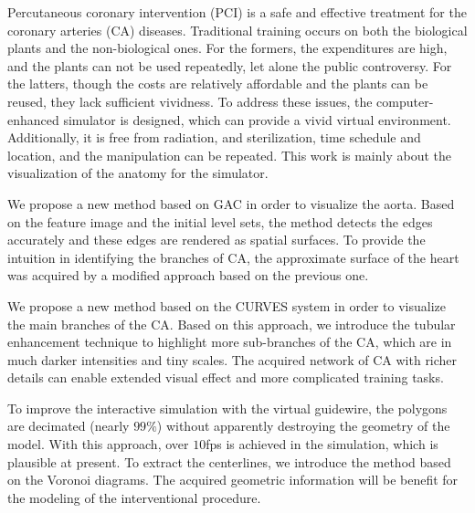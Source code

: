 
\begin{englishabstract}

Percutaneous coronary intervention (PCI) is a safe and effective treatment for the coronary arteries (CA) diseases.
Traditional training occurs on both the biological plants and the non-biological ones. 
For the formers, the expenditures are high, and the plants can not be used repeatedly, let alone the public controversy. 
For the latters, though the costs are relatively affordable and the plants can be reused, they lack sufficient vividness. 
To address these issues, the computer-enhanced simulator is designed, which can provide a vivid virtual environment.
Additionally, it is free from radiation, and sterilization, time schedule and location, and the manipulation can be repeated. 
This work is mainly about the visualization of the anatomy for the simulator.

We propose a new method based on GAC in order to visualize the aorta.
Based on the feature image and the initial level sets, the method detects the edges accurately and these edges are rendered as spatial surfaces. 
To provide the intuition in identifying the branches of CA, the approximate surface of the heart was acquired by a modified approach based on the previous one. 

We propose a new method based on the CURVES system in order to visualize the main branches of the CA. 
Based on this approach, we introduce the tubular enhancement technique to highlight more sub-branches of the CA, which are in much darker intensities and tiny scales.
The acquired network of CA with richer details can enable extended visual effect and more complicated training tasks.

To improve the interactive simulation with the virtual guidewire, the polygons are decimated (nearly $99 \%$) without apparently destroying the geometry of the model.
With this approach, over $10$fps is achieved in the simulation, which is plausible at present.
To extract the centerlines, we introduce the method based on the Voronoi diagrams. 
The acquired geometric information will be benefit for the modeling of the interventional procedure.

%
\end{englishabstract}
